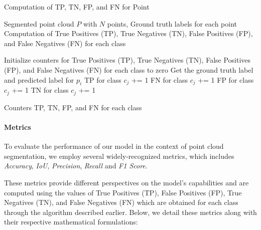 \documentclass[11pt, a4paper,oneside,chapterprefix=false]{scrbook}
\begin{document}
\begin{algorithm}[H]
\caption{Computation of TP, TN, FP, and FN for Point} \label{alg:computation of tp, tn, fp, fn}
\begin{algorithmic}[1]
\Require Segmented point cloud \(P\) with \(N\) points, Ground truth labels for each point
\Ensure Computation of True Positives (TP), True Negatives (TN), False Positives (FP), and False Negatives (FN) for each class

\State Initialize counters for True Positives (TP), True Negatives (TN), False Positives (FP), and False Negatives (FN) for each class to zero
    \State Get the ground truth label and predicted label for \(p_i\)
                \State TP for class \(c_j\) += 1
            \Else
                \State FN for class \(c_j\) += 1
            \EndIf
        \Else
                \State FP for class \(c_j\) += 1
            \Else
                \State TN for class \(c_j\) += 1
            \EndIf
        \EndIf
    \EndFor
\EndFor

\State \Return Counters TP, TN, FP, and FN for each class
\end{algorithmic}
\end{algorithm}

\paragraph{Metrics} \label{par:metrics}

To evaluate the performance of our model in the context of point cloud segmentation, we employ several widely-recognized metrics, which includes \textit{Accuracy}, \textit{IoU}, \textit{Precision}, \textit{Recall} and \textit{F1 Score}. 

\vspace{10pt}

These metrics provide different perspectives on the model's capabilities and are computed using the values of True Positives (TP), False Positives (FP), True Negatives (TN), and False Negatives (FN) which are obtained for each class through the algorithm described earlier. Below, we detail these metrics along with their respective mathematical formulations:

\vspace{10pt}
\end{document}
